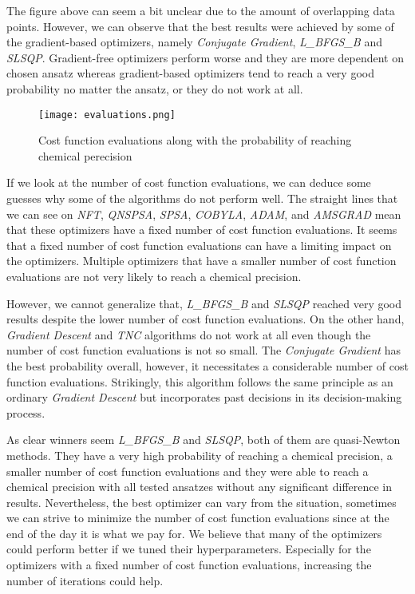 The figure above can seem a bit unclear due to the amount of overlapping data points. However, we can observe that the best results were achieved by some of the gradient-based optimizers, namely \textit{Conjugate Gradient}, \textit{L\_BFGS\_B} and \textit{SLSQP}. Gradient-free optimizers perform worse and they are more dependent on chosen ansatz whereas gradient-based optimizers tend to reach a very good probability no matter the ansatz, or they do not work at all. 

\begin{figure}[H]
    \centering
    \texttt{[image: evaluations.png]}
    \caption{Cost function evaluations along with the probability of reaching chemical perecision}
    \label{fig:evaluations}
\end{figure}

If we look at the number of cost function evaluations, we can deduce some guesses why some of the algorithms do not perform well. The straight lines that we can see on \textit{NFT}, \textit{QNSPSA}, \textit{SPSA}, \textit{COBYLA}, \textit{ADAM}, and \textit{AMSGRAD} mean that these optimizers have a fixed number of cost function evaluations. It seems that a fixed number of cost function evaluations can have a limiting impact on the optimizers. Multiple optimizers that have a smaller number of cost function evaluations are not very likely to reach a chemical precision.

However, we cannot generalize that, \textit{L\_BFGS\_B} and \textit{SLSQP} reached very good results despite the lower number of cost function evaluations. On the other hand, \textit{Gradient Descent} and \textit{TNC} algorithms do not work at all even though the number of cost function evaluations is not so small. The \textit{Conjugate Gradient} has the best probability overall, however, it necessitates a considerable number of cost function evaluations. Strikingly, this algorithm follows the same principle as an ordinary \textit{Gradient Descent} but incorporates past decisions in its decision-making process.

As clear winners seem \textit{L\_BFGS\_B} and \textit{SLSQP}, both of them are quasi-Newton methods. They have a very high probability of reaching a chemical precision, a smaller number of cost function evaluations and they were able to reach a chemical precision with all tested ansatzes without any significant difference in results. Nevertheless, the best optimizer can vary from the situation, sometimes we can strive to minimize the number of cost function evaluations since at the end of the day it is what we pay for. We believe that many of the optimizers could perform better if we tuned their hyperparameters. Especially for the optimizers with a fixed number of cost function evaluations, increasing the number of iterations could help.